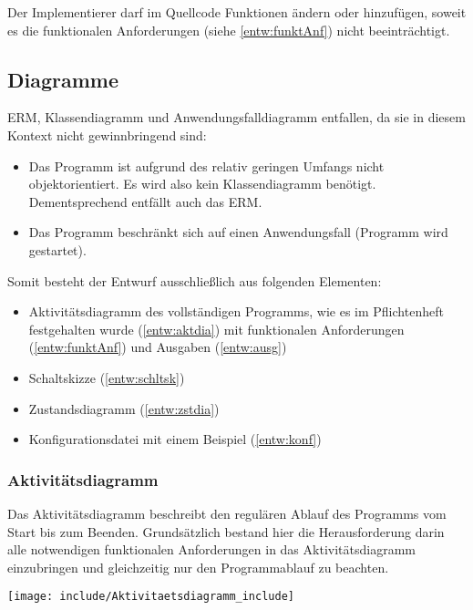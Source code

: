 	Der Implementierer darf im Quellcode Funktionen ändern oder hinzufügen, soweit es die funktionalen Anforderungen (siehe \autoref{entw:funktAnf}) nicht beeinträchtigt.
\clearpage
\subsection{Diagramme}
ERM, Klassendiagramm und Anwendungsfalldiagramm entfallen, da sie in diesem Kontext nicht gewinnbringend sind: 
\begin{itemize}
\item Das Programm ist aufgrund des relativ geringen Umfangs nicht objektorientiert. Es wird also kein Klassendiagramm benötigt. Dementsprechend entfällt auch das ERM.
\item Das Programm beschränkt sich auf einen Anwendungsfall (Programm wird gestartet).
\end{itemize}
Somit besteht der Entwurf ausschließlich aus folgenden Elementen:
\begin{itemize}
	\item Aktivitätsdiagramm des vollständigen Programms, wie es im Pflichtenheft festgehalten wurde (\autoref{entw:aktdia}) mit funktionalen Anforderungen (\autoref{entw:funktAnf}) und Ausgaben (\autoref{entw:ausg})
	\item Schaltskizze (\autoref{entw:schltsk})
	\item Zustandsdiagramm (\autoref{entw:zstdia})
	\item Konfigurationsdatei mit einem Beispiel (\autoref{entw:konf})
\end{itemize}	

\clearpage
\subsubsection{Aktivitätsdiagramm}
	Das Aktivitätsdiagramm beschreibt den regulären Ablauf des Programms vom Start bis zum Beenden. Grundsätzlich bestand hier die Herausforderung darin alle notwendigen funktionalen Anforderungen in das Aktivitätsdiagramm einzubringen und gleichzeitig nur den Programmablauf zu beachten. %
\label{entw:aktdia}
\begin{center}
\texttt{[image: include/Aktivitaetsdiagramm\_include]}
\end{center}

\clearpage
